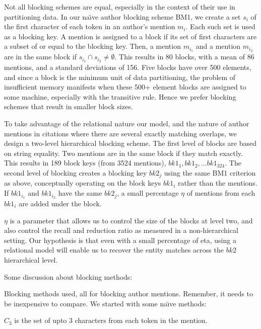\documentclass{article}
\begin{document}
Not all blocking schemes are equal, especially in the context of their use in partitioning data. In our na\"{\i}ve author blocking scheme BM1, we create a set $s_i$ of the first character of each token in an author's mention $m_i$. Each such set is used as a blocking key. A mention is assigned to a block if its set of first characters are a subset of or equal to the blocking key. Then, a mention $m_{i_1}$ and a mention $m_{i_2}$ are in the same block if $s_{i_1} \cap s_{i_2} \neq \emptyset$. This results in 80 blocks, with a mean of 86 mentions, and a standard deviations of 156. Five blocks have over 500 elements, and since a block is the minimum unit of data partitioning, the problem of insufficient memory manifests when these 500+ element blocks are assigned to some machine, especially with the transitive rule. Hence we prefer blocking schemes that result in smaller block sizes.

To take advantage of the relational nature our model, and the nature of author mentions in citations where there are several exactly matching overlaps, we design a two-level hierarchical blocking scheme. The first level of blocks are based on string equality. Two mentions are in the same block if they match exactly. This results in 189 block keys (from 3524 mentions), $bk1_1, bk1_2, ... bk1_324$. The second level of blocking creates a blocking key $bk2_j$ using the same BM1 criterion as above, conceptually operating on the block keys $bk1_i$ rather than the mentions. If $bk1_{i_1}$ and $bk1_{i_2}$ have the same $bk2_j$, a small percentage $\eta$ of mentions from each $bk1_i$ are added under the block.

$\eta$ is a parameter that allows us to control the size of the blocks at level two, and also control the recall and reduction ratio as measured in a non-hierarchical setting. Our hypothesis is that even with a small percentage of eta, using a relational model will enable us to recover the entity matches across the $bk2$ hierarchical level.

Some discussion about blocking methods:

Blocking methods used, all for blocking author mentions. Remember, it needs to be inexpensive to compare. We started with some na\"{\i}ve methods:

$C_3$ is the set of upto 3 characters from each token in the mention.
\end{document}
